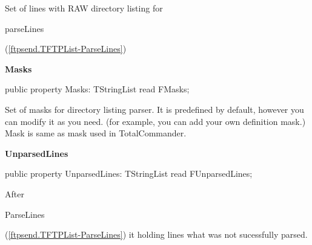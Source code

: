 \documentclass{report}
\newif\ifpdf
\begin{document}
\begin{list}{}
\begin{flushleft}
\ifpdf
\end{flushleft}
\fi


\par Set of lines with RAW directory listing for \begin{ttfamily}parseLines\end{ttfamily}(\ref{ftpsend.TFTPList-ParseLines})\label{ftpsend.TFTPList-Masks}
\item[\textbf{Masks}\hfill]
\ifpdf
\begin{flushleft}
\fi
\begin{ttfamily}
public property Masks: TStringList read FMasks;\end{ttfamily}

\ifpdf
\end{flushleft}
\fi


\par Set of masks for directory listing parser. It is predefined by default, however you can modify it as you need. (for example, you can add your own definition mask.) Mask is same as mask used in TotalCommander.\label{ftpsend.TFTPList-UnparsedLines}
\item[\textbf{UnparsedLines}\hfill]
\ifpdf
\begin{flushleft}
\fi
\begin{ttfamily}
public property UnparsedLines: TStringList read FUnparsedLines;\end{ttfamily}

\ifpdf
\end{flushleft}
\fi


\par After \begin{ttfamily}ParseLines\end{ttfamily}(\ref{ftpsend.TFTPList-ParseLines}) it holding lines what was not sucessfully parsed.\end{list}
\end{document}
